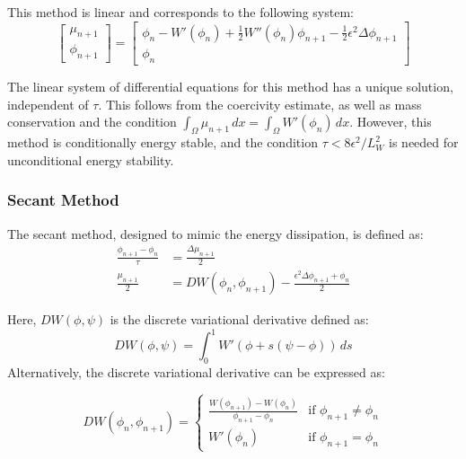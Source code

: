 \documentclass{article}
\begin{document}
This method is linear and corresponds to the following system:
\begin{equation}
    \begin{bmatrix}
    \mu_{n+1} \\
    \phi_{n+1}
    \end{bmatrix}
    =
    \begin{bmatrix}
    \phi_n - W'(\phi_n) + \frac{1}{2}W''(\phi_n)\phi_{n+1} - \frac{1}{2}\epsilon^2\Delta\phi_{n+1} \\
    \phi_n
    \end{bmatrix}
\end{equation}

The linear system of differential equations for this method has a unique solution, independent of $\tau$. This follows from the coercivity estimate, as well as mass conservation and the condition $\int_\Omega \mu_{n+1} \, dx = \int_\Omega W'(\phi_n) \, dx$. However, this method is conditionally energy stable, and the condition $\tau < 8\epsilon^2/L_W^2$ is needed for unconditional energy stability.

\subsubsection{Secant Method}
The secant method, designed to mimic the energy dissipation, is defined as:
\begin{align}
    \frac{\phi_{n+1} - \phi_n}{\tau} &= \frac{\Delta \mu_{n+1}}{2} \label{eq:secant_phi} \\
    \frac{\mu_{n+1}}{2} &= DW(\phi_n, \phi_{n+1}) - \frac{\epsilon^2\Delta \phi_{n+1} + \phi_n}{2} \label{eq:secant_mu}
\end{align}

Here, $DW(\phi, \psi)$ is the discrete variational derivative defined as:
\begin{equation}
    DW(\phi, \psi) = \int_0^1 W'(\phi + s(\psi - \phi)) \, ds
\end{equation}
Alternatively, the discrete variational derivative can be expressed as:

\begin{equation}
DW(\phi_n, \phi_{n+1}) = \begin{cases}
\frac{W(\phi_{n+1}) - W(\phi_n)}{\phi_{n+1} - \phi_n} & \text{if } \phi_{n+1} \neq \phi_n \\
W'(\phi_n) & \text{if } \phi_{n+1} = \phi_n
\end{cases}
\end{equation}
\end{document}
